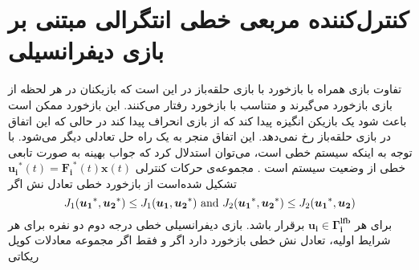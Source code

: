 \section{کنترل‌کننده مربعی خطی انتگرالی مبتنی بر بازی دیفرانسیلی}\label{LQIDG}
تفاوت بازی همراه با بازخورد با بازی حلقه‌باز در این است که بازیکنان در هر لحظه از بازی بازخورد می‌گیرند و متناسب با بازخورد رفتار می‌کنند. این بازخورد ممکن است باعث شود یک بازیکن انگیزه پیدا کند که از بازی انحراف پیدا کند در حالی که این اتفاق در بازی حلقه‌باز رخ نمی‌دهد. این اتفاق منجر به یک راه حل تعادلی دیگر می‌شود. 
با توجه به اینکه سیستم خطی است، می‌توان استدلال کرد که جواب بهینه به صورت تابعی خطی از وضعیت سیستم است \cite{article1}
.
%
مجموعه‌ی حرکات کنترلی 
$\boldsymbol{u_i}^*(t)=\boldsymbol{F_i}^*(t)\boldsymbol{x}(t)$
تشکیل شده‌است از بازخورد خطی تعادل نش اگر
\begin{equation*}
	J_1(\boldsymbol{u_1}^*, \boldsymbol{u_2}^*)\leq J_1(\boldsymbol{u_1}, \boldsymbol{u_2}^*)\text{\rm{ and }}
	J_2(\boldsymbol{u_1}^*,\boldsymbol{ u_2}^*)\leq J_2(\boldsymbol{u_1}^*, \boldsymbol{u_2})
\end{equation*}
برای هر 
$\boldsymbol{u_i}\in \boldsymbol{\Gamma^{lfb}_i}$
برقرار باشد.
بازی دیفرانسیلی خطی درجه دوم دو نفره برای هر شرایط اولیه، تعادل نش خطی بازخورد دارد اگر و فقط اگر مجموعه معادلات کوپل ریکاتی

